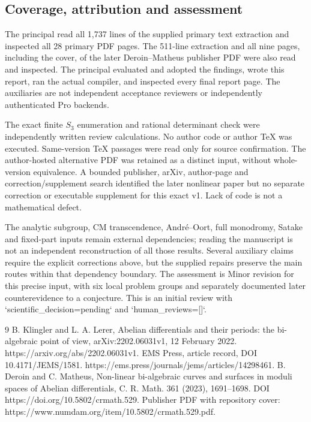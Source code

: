 \documentclass[10pt]{article}
\begin{document}
\subsection*{Coverage, attribution and assessment}
The principal read all 1,737 lines of the supplied primary text extraction and inspected all 28 primary PDF pages. The 511-line extraction and all nine pages, including the cover, of the later Deroin–Matheus publisher PDF were also read and inspected. The principal evaluated and adopted the findings, wrote this report, ran the actual compiler, and inspected every final report page. The auxiliaries are not independent acceptance reviewers or independently authenticated Pro backends.\par
The exact finite \(S_3\) enumeration and rational determinant check were independently written review calculations. No author code or author TeX was executed. Same-version TeX passages were read only for source confirmation. The author-hosted alternative PDF was retained as a distinct input, without whole-version equivalence. A bounded publisher, arXiv, author-page and correction/supplement search identified the later nonlinear paper but no separate correction or executable supplement for this exact v1. Lack of code is not a mathematical defect.\par
The analytic subgroup, CM transcendence, André–Oort, full monodromy, Satake and fixed-part inputs remain external dependencies; reading the manuscript is not an independent reconstruction of all those results. Several auxiliary claims require the explicit corrections above, but the supplied repairs preserve the main routes within that dependency boundary. The assessment is Minor revision for this precise input, with six local problem groups and separately documented later counterevidence to a conjecture. This is an initial review with `scientific\_decision=pending` and `human\_reviews=[]`.\par
9 B. Klingler and L. A. Lerer, Abelian differentials and their periods: the bi-algebraic point of view, arXiv:2202.06031v1, 12 February 2022. https://arxiv.org/abs/2202.06031v1. EMS Press, article record, DOI 10.4171/JEMS/1581. https://ems.press/journals/jems/articles/14298461. B. Deroin and C. Matheus, Non-linear bi-algebraic curves and surfaces in moduli spaces of Abelian differentials, C. R. Math. 361 (2023), 1691–1698. DOI https://doi.org/10.5802/crmath.529. Publisher PDF with repository cover: https://www.numdam.org/item/10.5802/crmath.529.pdf.\par
\end{document}
